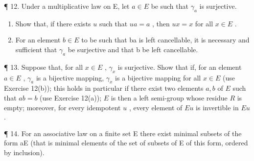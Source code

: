 ¶ 12. Under a multiplicative law on E, let \(a \in E\) be such that \(\gamma_{a}\) is surjective.

\begin{enumerate}
\def\labelenumi{(\alph{enumi})}
\item
  Show that, if there exists \(u\) such that \(ua = a\) , then \(ux = x\) for all \(x \in E\) .
\item
  For an element \(b \in E\) to be such that ba is left cancellable, it is necessary and sufficient that \(\gamma_{a}\) be surjective and that b be left cancellable.
\end{enumerate}

¶ 13. Suppose that, for all \(x \in E\) , \(\gamma_x\) is surjective. Show that if, for an element \(a \in E\) , \(\gamma_a\) is a bijective mapping, \(\gamma_x\) is a bijective mapping for all \(x \in E\) (use Exercise 12(b)); this holds in particular if there exist two elements \(a, b\) of \(E\) such that \(ab = b\) (use Exercise 12(a)); \(E\) is then a left semi-group whose residue \(R\) is empty; moreover, for every idempotent \(u\) , every element of \(Eu\) is invertible in \(Eu\) .

¶ 14. For an associative law on a finite set E there exist minimal subsets of the form aE (that is minimal elements of the set of subsets of E of this form, ordered by inclusion).

